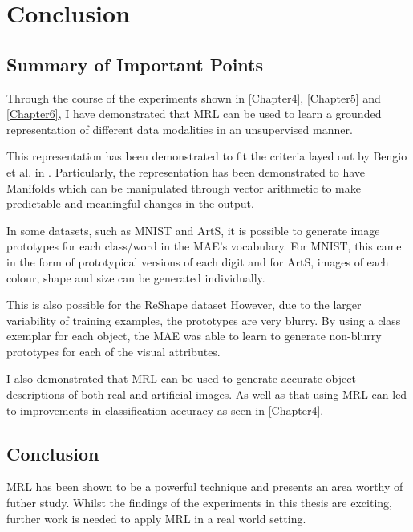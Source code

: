 
\chapter{Conclusion} %

\label{Chapter7} %



\section{Summary of Important Points}
Through the course of the experiments shown in \autoref{Chapter4}, \autoref{Chapter5} and \autoref{Chapter6}, I have demonstrated that  \ac{MRL} can be used to learn a grounded representation of different data modalities in an unsupervised manner.

This representation has been demonstrated to fit the criteria layed out by Bengio et al. in \cite{repRev}. Particularly, the representation has been demonstrated to have Manifolds which can be manipulated through vector arithmetic to make predictable and meaningful changes in the output.

In some datasets, such as MNIST and ArtS, it is possible to generate image prototypes for each class/word in the \ac{MAE}'s vocabulary. For MNIST, this came in the form of prototypical versions of each digit and for ArtS, images of each colour, shape and size can be generated individually.

This is also possible for the ReShape dataset However, due to the larger variability of training examples, the prototypes are very blurry. By using a class exemplar for each object, the \ac{MAE} was able to learn to generate non-blurry prototypes for each of the visual attributes.

I also demonstrated that \ac{MRL} can be used to generate accurate object descriptions of both real and artificial images. As well as that using \ac{MRL} can led to improvements in classification accuracy as seen in \autoref{Chapter4}.


\section{Conclusion}
\ac{MRL} has been shown to be a powerful technique and presents an area worthy of futher study. Whilst the findings of the experiments in this thesis are exciting, further work is needed to apply \ac{MRL} in a real world setting.

